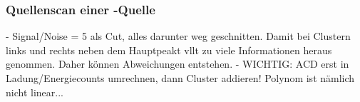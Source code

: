 \subsubsection{Quellenscan einer \texorpdfstring{}{Sr}-Quelle}
\label{sec:Quellenscan-Auswertung}

- Signal/Noise = 5 als Cut, alles darunter weg geschnitten. Damit bei Clustern
links und rechts neben dem Hauptpeakt vllt zu viele Informationen heraus genommen.
Daher können Abweichungen entstehen.
- WICHTIG: ACD erst in Ladung/Energiecounts umrechnen, dann Cluster addieren!
Polynom ist nämlich nicht linear...
